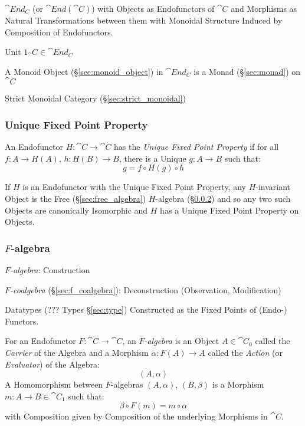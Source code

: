 $\cat{End_C}$ (or $\cat{End}(\cat{C})$) with Objects as
Endofunctors of $\cat{C}$ and Morphisms as Natural Transformations
between them with Monoidal Structure Induced by Composition of
Endofunctors.

Unit $1_\cat{C} \in \cat{End_C}$

A Monoid Object (\S\ref{sec:monoid_object}) in $\cat{End_C}$ is a
Monad (\S\ref{sec:monad}) on $\cat{C}$

Strict Monoidal Category (\S\ref{sec:strict_monoidal})



\subsubsection{Unique Fixed Point Property}\label{sec:ufpp}

An Endofunctor $H : \cat{C} \rightarrow \cat{C}$ has the \emph{Unique
  Fixed Point Property} if for all $f : A \rightarrow H(A)$, $h : H(B)
\rightarrow B$, there is a Unique $g : A \rightarrow B$ such that:
\[
  g = f \circ H(g) \circ h
\]

If $H$ is an Endofunctor with the Unique Fixed Point Property, any
$H$-invariant Object is the Free (\S\ref{sec:free_algebra})
$H$-algebra (\S\ref{sec:f_algebra}) and so any two such Objects are
canonically Isomorphic and $H$ has a Unique Fixed Point Property on
Objects.



\subsubsection{$F$-algebra}\label{sec:f_algebra}

\emph{$F$-algebra}: Construction

\emph{$F$-coalgebra} (\S\ref{sec:f_coalgebra}): Deconstruction
(Observation, Modification)

Datatypes (??? Types \S\ref{sec:type}) Constructed as the Fixed Points
of (Endo-) Functors. \cite{jones95} %

For an Endofunctor $F : \cat{C} \rightarrow \cat{C}$, an
\emph{$F$-algebra} is an Object $A \in \cat{C}_0$ called the
\emph{Carrier} of the Algebra and a Morphism $\alpha : F (A)
\rightarrow A$ called the \emph{Action} (or \emph{Evaluator}) of the
Algebra: \cite{corfield08}
\[
  (A,\alpha)
\]
A Homomorphism between $F$-algebras $(A,\alpha)$, $(B,\beta)$ is a
Morphism $m : A \rightarrow B \in \cat{C}_1$ such that:
\[
  \beta \circ F(m) = m \circ \alpha
\]
with Composition given by Composition of the underlying Morphisms in
$\cat{C}$.

